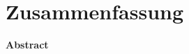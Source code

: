 \chapter*{Zusammenfassung}
\thezusammenfassung
%
\bigskip\bigskip\bigskip\bigskip\bigskip
\begin{flushright}
	{\LARGE\sffamily \textbf{Abstract}}
\end{flushright}
\bigskip\bigskip\bigskip
\theabstract
